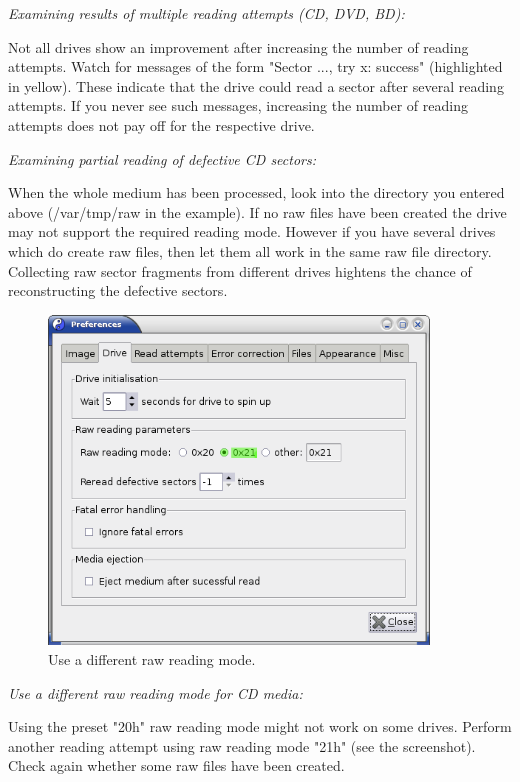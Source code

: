 {\em Examining results of multiple reading attempts (CD, DVD, BD):}

Not all drives show an improvement after increasing the number of
reading attempts. Watch for messages of the
form "Sector ..., try x: success" (highlighted in yellow). These
indicate that the drive could read a sector after several reading
attempts. If you never see such messages, increasing the number of
reading attempts does not pay off for the respective drive. 

\bigskip

{\em Examining partial reading of defective CD sectors:}

When the whole medium has been processed, look into the directory you
entered above (/var/tmp/raw in the example). If no raw files have
been created the drive may not support the required reading mode.
However if you have several drives which do create raw files, then
let them all work in the same raw file directory. Collecting raw sector
fragments from different drives hightens the chance of reconstructing
the defective sectors. 

\newpage

\begin{figure}[h]
\centerline{\includegraphics[width=0.9\textwidth]{screenshots/fix-prefs-read-drive-adv.png}}
\caption{Use a different raw reading mode.}
\label{howto-recover-different-raw-reading-mode}
\end{figure}

{\em Use a different raw reading mode for CD media:}

Using the preset "20h" raw reading mode might not work on
some drives. Perform another reading attempt using raw reading
mode "21h" (see the screenshot). Check again whether some raw
files have been created. 

